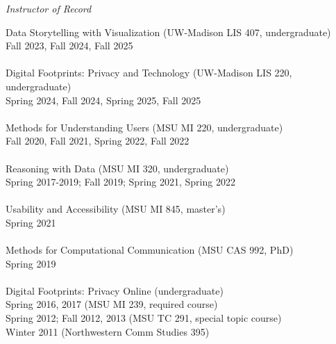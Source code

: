 \documentclass[9pt]{extarticle}
\begin{document}
\emph{Instructor of Record} \\[1pt]
\begin{tabbing}

Data Storytelling with Visualization (UW-Madison LIS 407, undergraduate) \\
\hspace{0.5cm} Fall 2023, Fall 2024, Fall 2025 \\\\

Digital Footprints: Privacy and Technology (UW-Madison LIS 220, undergraduate) \\
\hspace{0.5cm} Spring 2024, Fall 2024, Spring 2025, Fall 2025 \\\\

Methods for Understanding Users (MSU MI 220, undergraduate) \\
\hspace{0.5cm} Fall 2020, Fall 2021, Spring 2022, Fall 2022 \\\\

Reasoning with Data (MSU MI 320, undergraduate) \\
\hspace{0.5cm} Spring 2017-2019; Fall 2019; Spring 2021, Spring 2022 \\\\

Usability and Accessibility (MSU MI 845, master's) \\
\hspace{0.5cm} Spring 2021 \\\\

Methods for Computational Communication (MSU CAS 992, PhD) \\
\hspace{0.5cm} Spring 2019 \\\\

Digital Footprints: Privacy Online (undergraduate) \\ 
\hspace{0.5cm} Spring 2016, 2017 (MSU MI 239, required course) \\
\hspace{0.5cm} Spring 2012; Fall 2012, 2013 (MSU TC 291, special topic course) \\ 
\hspace{0.5cm} Winter 2011 (Northwestern Comm Studies 395) \\\\


\end{tabbing}
\end{document}
